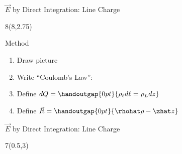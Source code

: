 \begin{lesson19}
\begin{frame}{$\vec{E}$ by Direct Integration: Line Charge}
\begin{textblock}{8}(8,2.75)
\begin{myblock}[0.9]{Method}
	\begin{enumerate}
		\setlength\itemsep{12pt}
		\item Draw picture 
		\item Write ``Coulomb's Law'':
			
			\vspace{-18pt}
			\vspace{-28pt}
			
		\item Define $dQ = \handoutgap{0pt}{\rho_\ell d\ell = \rho_L dz} $ 
		\item Define $\vec{R} = \handoutgap{0pt}{ \rhohat \rho - \zhat z } $ 
		\vspace{-8pt}
		
	\end{enumerate}
\end{myblock}
\end{textblock}
\end{frame}


\begin{frame}{$\vec{E}$ by Direct Integration: Line Charge}
\begin{textblock}{7}(0.5,3)
\end{textblock}


\end{frame}
\end{lesson19}
